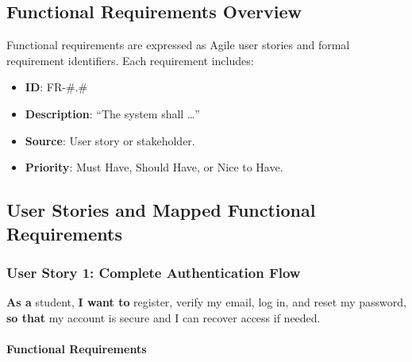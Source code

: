 \documentclass[12pt,a4paper]{article}
\begin{document}
\subsection{Functional Requirements Overview}

Functional requirements are expressed as Agile user stories and formal requirement identifiers. Each requirement includes:

\begin{itemize}
    \item \textbf{ID}: FR-\#.\#
    \item \textbf{Description}: ``The system shall \dots''
    \item \textbf{Source}: User story or stakeholder.
    \item \textbf{Priority}: Must Have, Should Have, or Nice to Have.
\end{itemize}

\subsection{User Stories and Mapped Functional Requirements}

\subsubsection{User Story 1: Complete Authentication Flow}

\textbf{As a} student, \textbf{I want to} register, verify my email, log in, and reset my password, \textbf{so that} my account is secure and I can recover access if needed.

\paragraph{Functional Requirements}
\end{document}
